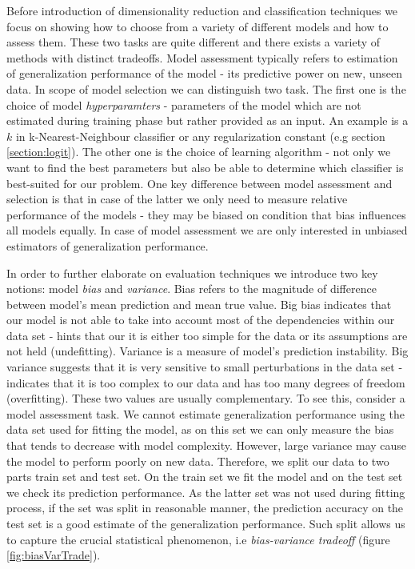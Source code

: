 \documentclass[shortabstract, english, mgr]{iithesis}
\begin{document}
Before introduction of dimensionality reduction and classification techniques we focus on showing how to choose from a variety of different models and how to assess them. These two tasks are quite different and there exists a variety of methods with distinct tradeoffs. Model assessment typically refers to estimation of generalization performance of the model - its predictive power on new, unseen data. In scope of model selection we can distinguish two task. The first one is the choice of model \textit{hyperparamters} - parameters of the model which are not estimated during training phase but rather provided as an input. An example is a $k$ in k-Nearest-Neighbour classifier or any regularization constant (e.g section \ref{section:logit}). The other one is the choice of learning algorithm - not only we want to find the best parameters but also be able to determine which classifier is best-suited for our problem. One key difference between model assessment and selection is that in case of the latter we only need to measure relative performance of the models - they may be biased on condition that bias influences all models equally. In case of model assessment we are only interested in unbiased estimators of generalization performance.

In order to further elaborate on evaluation techniques we introduce two key notions: model \textit{bias} and \textit{variance}. Bias refers to the magnitude of difference between model's mean prediction and mean true value. Big bias indicates that our model is not able to take into account most of the dependencies within our data set - hints that our it is either too simple for the data or its assumptions are not held (undefitting). Variance is a measure of model's prediction instability. Big variance suggests that it is very sensitive to small perturbations in the data set - indicates that it is too complex to our data and has too many degrees of freedom (overfitting). These two values are usually complementary. To see this, consider a model assessment task. We cannot estimate generalization performance using the data set used for fitting the model, as on this set we can only measure the bias that tends to decrease with model complexity. However, large variance may cause the model to perform poorly on new data. Therefore, we split our data to two parts train set and test set. On the train set we fit the model and on the test set we check its prediction performance. As the latter set was not used during fitting process, if the set was split in reasonable manner, the prediction accuracy on the test set is a good estimate of the generalization performance. Such split allows us to capture the crucial statistical phenomenon, i.e \textit{bias-variance tradeoff} (figure \ref{fig:biasVarTrade}). 
\end{document}
